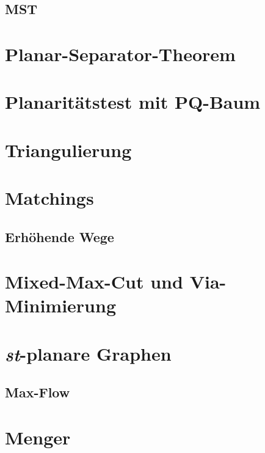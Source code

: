 \documentclass[10pt,a4paper]{article}
\begin{document}
\subsection{MST}


\section{Planar-Separator-Theorem}


\section{Planaritätstest mit PQ-Baum}


\section{Triangulierung}


\section{Matchings}
\subsection{Erhöhende Wege}


\section{Mixed-Max-Cut und Via-Minimierung}


\section{\textit{st}-planare Graphen}
\subsection{Max-Flow}


\section{Menger}
\end{document}
